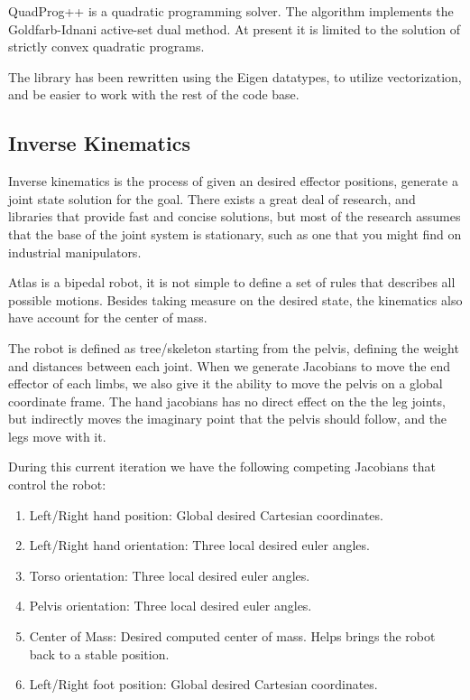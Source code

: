 \documentclass[12pt]{report}
\begin{document}
QuadProg++ is a quadratic programming solver. The algorithm implements the Goldfarb-Idnani active-set dual method. At present it is limited to the solution of strictly convex quadratic programs. \cite{quadprog}

The library has been rewritten using the Eigen datatypes, to utilize vectorization, and be easier to work with the rest of the code base. 

\subsection{Inverse Kinematics}


Inverse kinematics is the process of given an desired effector positions, generate a joint state solution for the goal. There exists a great deal of research, and libraries that provide fast and concise solutions, but most of the research assumes that the base of the joint system is stationary, such as one that you might find on industrial manipulators. 

Atlas is a bipedal robot, it is not simple to define a set of rules that describes all possible motions. Besides taking measure on the desired state, the kinematics also have account for the center of mass.

The robot is defined as tree/skeleton starting from the pelvis, defining the weight and distances between each joint. When we generate Jacobians \cite{robot_modeling} to move the end effector of each limbs, we also give it the ability to move the pelvis on a global coordinate frame. The hand jacobians has no direct effect on the the leg joints, but indirectly moves the imaginary point that the pelvis should follow, and the legs move with it. 

During this current iteration we have the following competing Jacobians that control the robot: 
\begin{enumerate}
\item Left/Right hand position: Global desired Cartesian coordinates.
\item Left/Right hand orientation: Three local desired euler angles.
\item Torso orientation: Three local desired euler angles.
\item Pelvis orientation: Three local desired euler angles.
\item Center of Mass: Desired computed center of mass. Helps brings the robot back to a stable position.
\item Left/Right foot position: Global desired Cartesian coordinates.
\end{enumerate}
\end{document}
